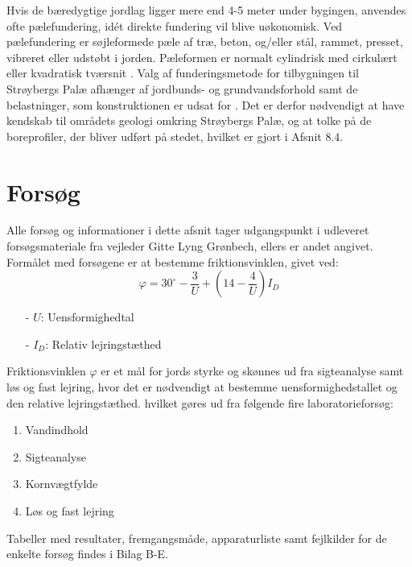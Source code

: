 Hvis de bæredygtige jordlag ligger mere end 4-5 meter under bygingen, anvendes ofte pælefundering, idét direkte fundering vil blive uøkonomisk. Ved pælefundering er søjleformede pæle af træ, beton, og/eller stål, rammet, presset, vibreret eller udstøbt i jorden. Pæleformen er normalt cylindrisk med cirkulært eller kvadratisk tværsnit \citep[ s. 355]{geoteknik}.
\newline
\newline
Valg af funderingsmetode for tilbygningen til Strøybergs Palæ afhænger af jordbunds- og grundvandsforhold samt de belastninger, som konstruktionen er udsat for \citep[ s. 355]{geoteknik}. Det er derfor nødvendigt at have kendskab til områdets geologi omkring Strøybergs Palæ, og at tolke på de boreprofiler, der bliver udført på stedet, hvilket er gjort i Afsnit 8.4. 

\section{Forsøg}
Alle forsøg og informationer i dette afsnit tager udgangspunkt i udleveret forsøgsmateriale fra vejleder Gitte Lyng Grønbech, ellers er andet angivet.
\newline \indent{     }  Formålet med forsøgene er at bestemme friktionsvinklen, givet ved: 
\begin{equation}
	\varphi = 30^\circ - \frac{3}{U} + (14 - \frac{4}{U}) I_D
\end{equation}

\begin{itemize}
	\item[-] $U$: Uensformighedtal
	\item[-] $I_D$: Relativ lejringstæthed
\end{itemize}

Friktionsvinklen $\varphi$ er et mål for jords styrke og skønnes ud fra sigteanalyse samt løs og fast lejring, hvor det er nødvendigt at bestemme uensformighedstallet og den relative lejringstæthed. hvilket gøres ud fra følgende fire laboratorieforsøg: 
\begin{enumerate}
	\item Vandindhold
	\item Sigteanalyse
	\item Kornvægtfylde
	\item Løs og fast lejring
\end{enumerate}
Tabeller med resultater, fremgangsmåde, apparaturliste samt fejlkilder for de enkelte forsøg findes i Bilag B-E.

